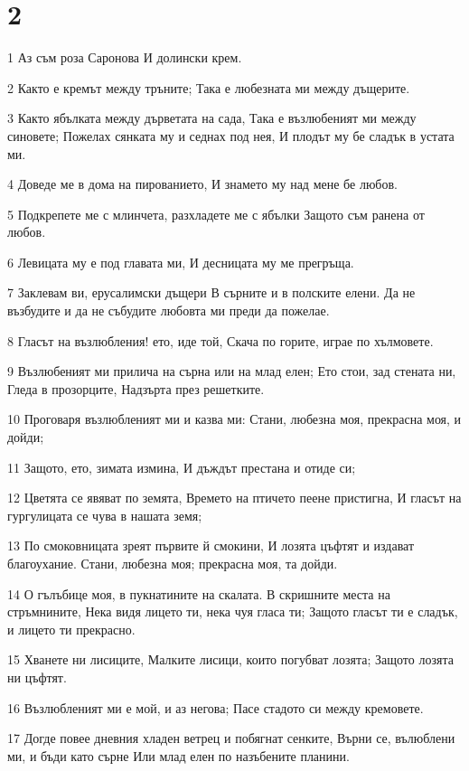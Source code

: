 \chapter{2}

\par 1 Аз съм роза Саронова И долински крем.
\par 2 Както е кремът между тръните; Така е любезната ми между дъщерите.
\par 3 Както ябълката между дърветата на сада, Така е възлюбеният ми между синовете; Пожелах сянката му и седнах под нея, И плодът му бе сладък в устата ми.
\par 4 Доведе ме в дома на пированието, И знамето му над мене бе любов.
\par 5 Подкрепете ме с млинчета, разхладете ме с ябълки Защото съм ранена от любов.
\par 6 Левицата му е под главата ми, И десницата му ме прегръща.
\par 7 Заклевам ви, ерусалимски дъщери В сърните и в полските елени. Да не възбудите и да не събудите любовта ми преди да пожелае.
\par 8 Гласът на възлюбления! ето, иде той, Скача по горите, играе по хълмовете.
\par 9 Възлюбеният ми прилича на сърна или на млад елен; Ето стои, зад стената ни, Гледа в прозорците, Надзърта през решетките.
\par 10 Проговаря възлюбленият ми и казва ми: Стани, любезна моя, прекрасна моя, и дойди;
\par 11 Защото, ето, зимата измина, И дъждът престана и отиде си;
\par 12 Цветята се явяват по земята, Времето на птичето пеене пристигна, И гласът на гургулицата се чува в нашата земя;
\par 13 По смоковницата зреят първите й смокини, И лозята цъфтят и издават благоухание. Стани, любезна моя; прекрасна моя, та дойди.
\par 14 О гълъбице моя, в пукнатините на скалата. В скришните места на стръмнините, Нека видя лицето ти, нека чуя гласа ти; Защото гласът ти е сладък, и лицето ти прекрасно.
\par 15 Хванете ни лисиците, Малките лисици, които погубват лозята; Защото лозята ни цъфтят.
\par 16 Възлюбленият ми е мой, и аз негова; Пасе стадото си между кремовете.
\par 17 Догде повее дневния хладен ветрец и побягнат сенките, Върни се, вълюблени ми, и бъди като сърне Или млад елен по назъбените планини.

